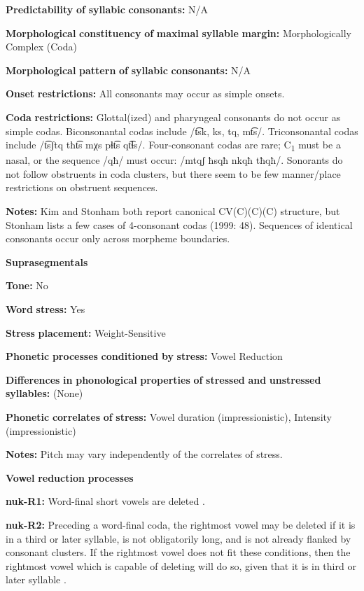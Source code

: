 \textbf{Predictability} \textbf{of} \textbf{syllabic} \textbf{consonants:} N/A

\textbf{Morphological} \textbf{constituency} \textbf{of} \textbf{maximal} \textbf{syllable} \textbf{margin:} Morphologically Complex (Coda)

\textbf{Morphological} \textbf{pattern} \textbf{of} \textbf{syllabic} \textbf{consonants:} N/A

\textbf{Onset} \textbf{restrictions:} All consonants may occur as simple onsets.

\textbf{Coda} \textbf{restrictions:} Glottal(ized) and pharyngeal consonants do not occur as simple codas. Biconsonantal codas include /t͡sk, ks, tq, mt͡s/. Triconsonantal codas include /t͡sʃtq tħt͡s mχs pɬt͡s qt͡ɬs/. Four-consonant codas are rare; C\textsubscript{1} must be a nasal, or the sequence /qħ/ must occur: /mtqʃ ħsqħ nkqħ tħqħ/. Sonorants do not follow obstruents in coda clusters, but there seem to be few manner/place restrictions on obstruent sequences.

\textbf{Notes:} Kim and Stonham both report canonical CV(C)(C)(C) structure, but Stonham lists a few cases of 4-consonant codas (1999: 48). Sequences of identical consonants occur only across morpheme boundaries.

\textbf{Suprasegmentals}

\textbf{Tone:} No

\textbf{Word} \textbf{stress:} Yes

\textbf{Stress} \textbf{placement:} Weight-Sensitive

\textbf{Phonetic} \textbf{processes} \textbf{conditioned} \textbf{by} \textbf{stress:} Vowel Reduction

\textbf{Differences} \textbf{in} \textbf{phonological} \textbf{properties} \textbf{of} \textbf{stressed} \textbf{and} \textbf{unstressed} \textbf{syllables:} (None)

\textbf{Phonetic} \textbf{correlates} \textbf{of} \textbf{stress:} Vowel duration (impressionistic), Intensity (impressionistic)

\textbf{Notes:} Pitch may vary independently of the correlates of stress.

\textbf{Vowel} \textbf{reduction} \textbf{processes}

\textbf{nuk-R1:} Word-final short vowels are deleted \citep[25]{Rose1981}.

\textbf{nuk-R2:} Preceding a word-final coda, the rightmost vowel may be deleted if it is in a third or later syllable, is not obligatorily long, and is not already flanked by consonant clusters. If the rightmost vowel does not fit these conditions, then the rightmost vowel which is capable of deleting will do so, given that it is in third or later syllable \citep[25]{Rose1981}.

